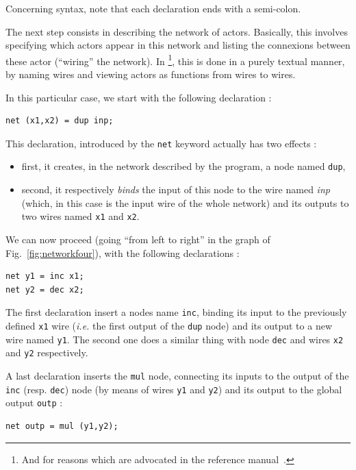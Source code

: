 Concerning syntax, note that each declaration ends with a semi-colon.

\medskip
The next step consists in describing the network of actors. Basically, this involves specifying
which actors appear in this network and listing the connexions between these actor (``wiring'' the
network). In \caph\footnote{And for reasons which are advocated in the reference
  manual~\cite{caph-lrm}.}, this is done in a purely textual manner, by naming wires and viewing
actors as functions from wires to wires.

In this particular case, we start with the following declaration : 

\begin{lstlisting}[style=CaphStyle]
net (x1,x2) = dup inp;
\end{lstlisting}

This declaration, introduced by the \verb|net| keyword actually has two effects :
\begin{itemize}
\item first, it creates, in the network described by the program, a node named \texttt{dup},
\item second, it respectively \emph{binds} the input of this node to the wire named \emph{inp}
  (which, in this case is the input wire of the whole network) and  its outputs to two wires named
  \verb|x1| and \verb|x2|.
\end{itemize}

\medskip
We can now proceed (going ``from left to right'' in the graph of Fig.~\ref{fig:networkfour}), with
the following declarations : 

\begin{lstlisting}[style=CaphStyle]
net y1 = inc x1;
net y2 = dec x2;
\end{lstlisting}

The first declaration insert a nodes name \texttt{inc}, binding its 
input to the previously defined \texttt{x1} wire (\emph{i.e.} the first output of the \texttt{dup}
node) and its output to a new wire named \texttt{y1}. The second one does a similar thing with node
\texttt{dec} and wires \texttt{x2} and \texttt{y2} respectively.

\medskip
A last declaration inserts the \texttt{mul} node, connecting its inputs to the output of the
\texttt{inc} (resp. \texttt{dec}) node (by means of wires \texttt{y1} and \texttt{y2})  and its
output to the global output \texttt{outp} :

\begin{lstlisting}[style=CaphStyle]
net outp = mul (y1,y2);
\end{lstlisting}

